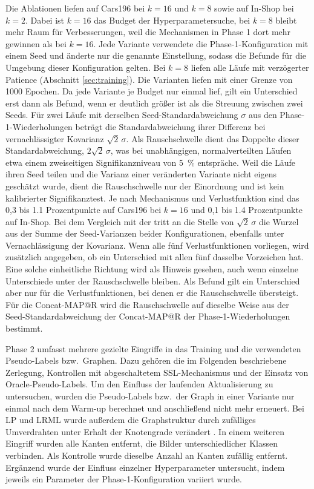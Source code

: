 Die Ablationen liefen auf Cars196 bei $k=16$ und $k=8$ sowie auf In-Shop bei $k=2$. Dabei ist $k=16$ das Budget der Hyperparametersuche, bei $k=8$ bleibt mehr Raum für Verbesserungen, weil die Mechanismen in Phase 1 dort mehr gewinnen als bei $k=16$. Jede Variante verwendete die Phase-1-Konfiguration mit einem Seed und änderte nur die genannte Einstellung, sodass die Befunde für die Umgebung dieser Konfiguration gelten. Bei $k=8$ liefen alle Läufe mit verzögerter Patience (Abschnitt \ref{sec:training}). Die Varianten liefen mit einer Grenze von \num{1000} Epochen. Da jede Variante je Budget nur einmal lief, gilt ein Unterschied erst dann als Befund, wenn er deutlich größer ist als die Streuung zwischen zwei Seeds. Für zwei Läufe mit derselben Seed-Standardabweichung $\sigma$ aus den Phase-1-Wiederholungen beträgt die Standardabweichung ihrer Differenz bei vernachlässigter Kovarianz $\sqrt{2}\,\sigma$. Als Rauschschwelle dient das Doppelte dieser Standardabweichung, $2\sqrt{2}\,\sigma$, was bei unabhängigen, normalverteilten Läufen etwa einem zweiseitigen Signifikanzniveau von \qty{5}{\percent} entspräche. Weil die Läufe ihren Seed teilen und die Varianz einer veränderten Variante nicht eigens geschätzt wurde, dient die Rauschschwelle nur der Einordnung und ist kein kalibrierter Signifikanztest. Je nach Mechanismus und Verlustfunktion sind das 0,3 bis \num{1,1} Prozentpunkte auf Cars196 bei $k=16$ und 0,1 bis \num{1,4} Prozentpunkte auf In-Shop. Bei dem Vergleich mit der \UEBL tritt an die Stelle von $\sqrt{2}\,\sigma$ die Wurzel aus der Summe der Seed-Varianzen beider Konfigurationen, ebenfalls unter Vernachlässigung der Kovarianz. Wenn alle fünf Verlustfunktionen vorliegen, wird zusätzlich angegeben, ob ein Unterschied mit allen fünf dasselbe Vorzeichen hat. Eine solche einheitliche Richtung wird als Hinweis gesehen, auch wenn einzelne Unterschiede unter der Rauschschwelle bleiben. Als Befund gilt ein Unterschied aber nur für die Verlustfunktionen, bei denen er die Rauschschwelle übersteigt. Für die Concat-\ac{MAP@R} wird die Rauschschwelle auf dieselbe Weise aus der Seed-Standardabweichung der Concat-\ac{MAP@R} der Phase-1-Wiederholungen bestimmt.

Phase 2 umfasst mehrere gezielte Eingriffe in das Training und die verwendeten Pseudo-Labels bzw.\ Graphen. Dazu gehören die im Folgenden beschriebene Zerlegung, Kontrollen mit abgeschaltetem \ac{SSL}-Mechanismus und der Einsatz von Oracle-Pseudo-Labels. Um den Einfluss der laufenden Aktualisierung zu untersuchen, wurden die Pseudo-Labels bzw.\ der Graph in einer Variante nur einmal nach dem Warm-up berechnet und anschließend nicht mehr erneuert. Bei \ac{LP} und \ac{LRML} wurde außerdem die Graphstruktur durch zufälliges Umverdrahten unter Erhalt der Knotengrade verändert \cite{maslov_specificity_2002}. In einem weiteren Eingriff wurden alle Kanten entfernt, die Bilder unterschiedlicher Klassen verbinden. Als Kontrolle wurde dieselbe Anzahl an Kanten zufällig entfernt. Ergänzend wurde der Einfluss einzelner Hyperparameter untersucht, indem jeweils ein Parameter der Phase-1-Konfiguration variiert wurde.

